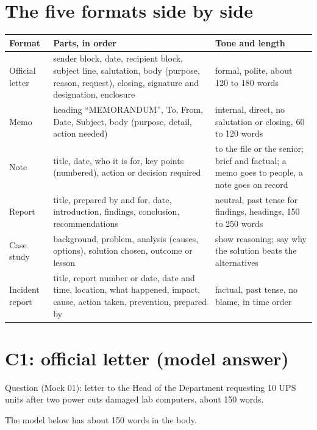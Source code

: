 \documentclass[11pt,a4paper]{article}
\newcommand{\tb}[1]{\textbf{\color{slate}#1}}
\begin{document}
\section{The five formats side by side}
\begin{center}\small\renewcommand{\arraystretch}{1.18}\setlength{\tabcolsep}{7pt}
\begin{tabularx}{\linewidth}{@{}>{\raggedright\arraybackslash}p{22mm}YY@{}}
\toprule
\tb{Format} & \tb{Parts, in order} & \tb{Tone and length} \\ \midrule
Official letter & sender block, date, recipient block, subject line, salutation, body (purpose, reason, request), closing, signature and designation, enclosure & formal, polite, about 120 to 180 words \\
Memo & heading ``MEMORANDUM'', To, From, Date, Subject, body (purpose, detail, action needed) & internal, direct, no salutation or closing, 60 to 120 words \\
Note & title, date, who it is for, key points (numbered), action or decision required & to the file or the senior; brief and factual; a memo goes to people, a note goes on record \\
Report & title, prepared by and for, date, introduction, findings, conclusion, recommendations & neutral, past tense for findings, headings, 150 to 250 words \\
Case study & background, problem, analysis (causes, options), solution chosen, outcome or lesson & show reasoning; say why the solution beats the alternatives \\
Incident report & title, report number or date, date and time, location, what happened, impact, cause, action taken, prevention, prepared by & factual, past tense, no blame, in time order \\
\bottomrule
\end{tabularx}\end{center}

\section{C1: official letter (model answer)}
Question (Mock 01): letter to the Head of the Department requesting 10 UPS units after two power cuts damaged lab computers, about 150 words.

The model below has about 150 words in the body.
\end{document}
